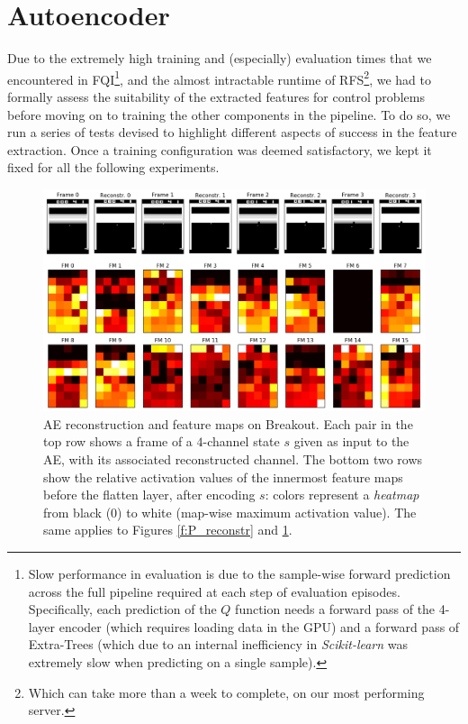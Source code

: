 \section{Autoencoder}
Due to the extremely high training and (especially) evaluation times that we 
encountered in FQI\footnote{Slow performance in evaluation is due to the 
sample-wise forward prediction across the full pipeline required at each step
of evaluation episodes. Specifically, each prediction of the $Q$ function needs 
a forward pass of the 4-layer encoder (which requires loading data in the GPU)
and a forward pass of Extra-Trees (which due to an internal inefficiency in 
\textit{Scikit-learn} was extremely slow when predicting on a single sample).},
and the almost intractable runtime of RFS\footnote{Which can take more than a 
week to complete, on our most performing server.}, we had to formally assess the 
suitability of the extracted features for control problems before moving on to 
training the other components in the pipeline. 
To do so, we run a series of tests devised to highlight different aspects of
success in the feature extraction. Once a training configuration was deemed 
satisfactory, we kept it fixed for all the following experiments.
%
\begin{figure}
    \includegraphics[width=\textwidth]{pictures/experiments/reconstr_breakout}
    \centering
    \caption[AE reconstruction and feature maps on Breakout]{AE reconstruction 
	    and feature maps on Breakout. 
	    Each pair in the top row shows a frame of a $4$-channel state $s$ 
	    given as input to the AE, with its associated reconstructed channel. 
	    The bottom two rows show the relative activation values of the 
	    innermost feature maps before the flatten layer, after encoding $s$: 
	    colors represent a \textit{heatmap} from black ($0$) to white 
	    (map-wise maximum activation value). The same applies to Figures 
	    \ref{f:P_reconstr} and \ref{f:BO_reconstr}.}
    \label{f:BO_reconstr}
\end{figure}
